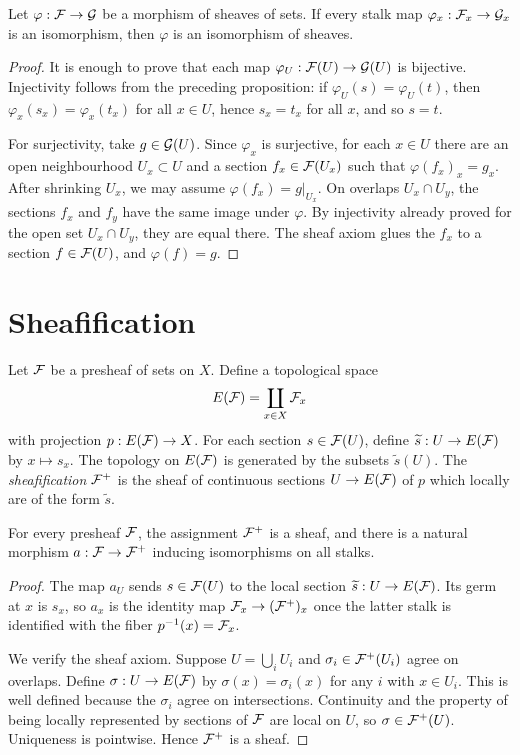 \begin{proposition}
Let \(\varphi:\mathcal{F}\to \mathcal{G}\) be a morphism of sheaves of sets.  If every stalk map
\(\varphi_x:\mathcal{F}_x\to \mathcal{G}_x\) is an isomorphism, then \(\varphi\) is an
isomorphism of sheaves.
\end{proposition}

\begin{proof}
It is enough to prove that each map \(\varphi_U:\mathcal{F}(U)\to\mathcal{G}(U)\) is bijective.
Injectivity follows from the preceding proposition: if
\(\varphi_U(s)=\varphi_U(t)\), then \(\varphi_x(s_x)=\varphi_x(t_x)\) for all
\(x\in U\), hence \(s_x=t_x\) for all \(x\), and so \(s=t\).

For surjectivity, take \(g\in \mathcal{G}(U)\).  Since \(\varphi_x\) is surjective, for
each \(x\in U\) there are an open neighbourhood \(U_x\subset U\) and a section
\(f_x\in \mathcal{F}(U_x)\) such that \(\varphi(f_x)_x=g_x\).  After shrinking \(U_x\),
we may assume \(\varphi(f_x)=g|_{U_x}\).  On overlaps \(U_x\cap U_y\), the
sections \(f_x\) and \(f_y\) have the same image under \(\varphi\).  By
injectivity already proved for the open set \(U_x\cap U_y\), they are equal
there.  The sheaf axiom glues the \(f_x\) to a section \(f\in\mathcal{F}(U)\), and
\(\varphi(f)=g\).
\end{proof}

\section{Sheafification}

\begin{definition}
Let \(\mathcal{F}\) be a presheaf of sets on \(X\).  Define a topological space
\[
    E(\mathcal{F})=\coprod_{x\in X}\mathcal{F}_x
\]
with projection \(p:E(\mathcal{F})\to X\).  For each section \(s\in \mathcal{F}(U)\), define
\(\widetilde{s}:U\to E(\mathcal{F})\) by \(x\mapsto s_x\).  The topology on \(E(\mathcal{F})\)
is generated by the subsets \(\widetilde{s}(U)\).  The \emph{sheafification}
\(\mathcal{F}^+\) is the sheaf of continuous sections \(U\to E(\mathcal{F})\) of \(p\) which
locally are of the form \(\widetilde{s}\).
\end{definition}

\begin{proposition}
For every presheaf \(\mathcal{F}\), the assignment \(\mathcal{F}^+\) is a sheaf, and there is a
natural morphism \(a:\mathcal{F}\to \mathcal{F}^+\) inducing isomorphisms on all stalks.
\end{proposition}

\begin{proof}
The map \(a_U\) sends \(s\in\mathcal{F}(U)\) to the local section
\(\widetilde{s}:U\to E(\mathcal{F})\).  Its germ at \(x\) is \(s_x\), so \(a_x\) is the
identity map \(\mathcal{F}_x\to(\mathcal{F}^+)_x\) once the latter stalk is identified with the
fiber \(p^{-1}(x)=\mathcal{F}_x\).

We verify the sheaf axiom.  Suppose \(U=\bigcup_i U_i\) and
\(\sigma_i\in\mathcal{F}^+(U_i)\) agree on overlaps.  Define \(\sigma:U\to E(\mathcal{F})\) by
\(\sigma(x)=\sigma_i(x)\) for any \(i\) with \(x\in U_i\).  This is well
defined because the \(\sigma_i\) agree on intersections.  Continuity and the
property of being locally represented by sections of \(\mathcal{F}\) are local on
\(U\), so \(\sigma\in\mathcal{F}^+(U)\).  Uniqueness is pointwise.  Hence \(\mathcal{F}^+\) is a
sheaf.
\end{proof}

